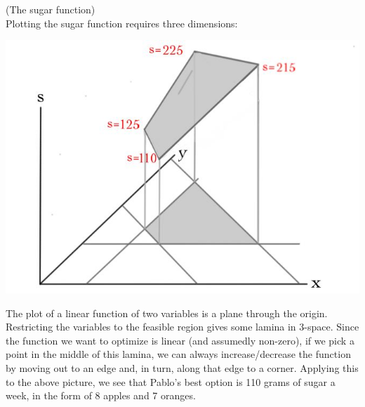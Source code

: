 \begin{example}(The sugar function)\\
Plotting the sugar function requires three dimensions:
\vspace{-1.5mm}
\begin{center}
\hspace{-1cm}\includegraphics[alt={The previous graph has been turned so that it lays flat in the plane.  Projected in the z direction is the sugar value at each of the vertices: 110, 125, 225, and 215.},scale=.38]{simplex/sugar.jpg}
\end{center}
\end{example} 

The plot of a linear function of two variables is a plane through the origin. 
Restricting the variables to the feasible region gives some lamina in 3-space.
Since the function we want to optimize is linear (and assumedly non-zero), 
if we pick a point in the middle of this lamina, we can always increase/decrease 
the function by moving out to an edge and, in turn, along that edge to a corner.
Applying this to the above picture,  we see that Pablo's best option is 110 grams of sugar a week, in the form of 
8 apples and 7 oranges.


